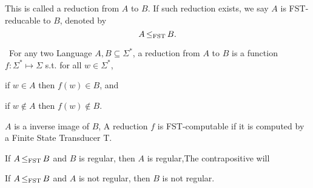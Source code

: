     This is  called a reduction from $A$ to $B$. If such reduction exists, we say $A$ is
    FST-reducable to $B$, denoted by
    \[
        A { \,\le_{\text{\upshape FST}}\, } B.
    \]

\begin{theorem}[]\ For any two Language $A,B \subseteq \Sigma^*$, a reduction from $A$ to
    $B$ is a function $f:\Sigma^* \mapsto \Sigma$ s.t. for all $w \in \Sigma^*$,
    \begin{compactitem}
    \item 
        if $w \in A$ then $f(w) \in B$, and
    \item
        if $w \not \in A$ then $f(w) \not \in B$.
    \end{compactitem}
    
    $A$ is a inverse image of $B$, A reduction $f$ is FST-computable if it is computed by
a Finite State Transducer T.  
\end{theorem}

\begin{corollary}
        If  $A { \,\le_{\text{\upshape FST}}\, } B $ and $B$ is regular, then $A$ is regular,The contrapositive will
\end{corollary}

\begin{corollary}
        If $A { \,\le_{\text{\upshape FST}}\, } B$ and $A$ is not regular, then $B$ is not regular.
\end{corollary}




